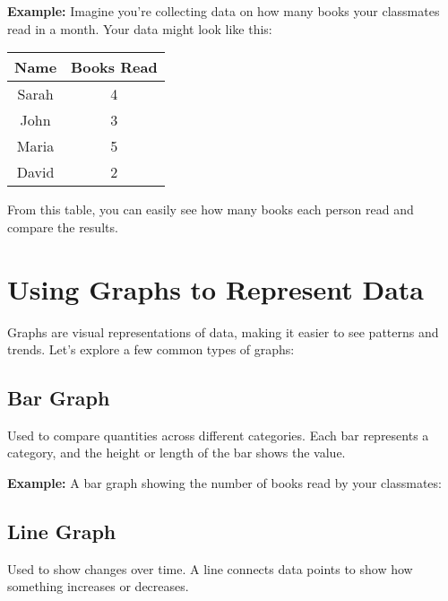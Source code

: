 \textbf{Example:} Imagine you're collecting data on how many books your classmates read in a month. Your data might look like this:

\begin{tabular}{|c|c|}
\hline
Name & Books Read \\
\hline
Sarah & 4 \\
John & 3 \\
Maria & 5 \\
David & 2 \\
\hline
\end{tabular}

From this table, you can easily see how many books each person read and compare the results.

\section{Using Graphs to Represent Data}
Graphs are visual representations of data, making it easier to see patterns and trends. Let’s explore a few common types of graphs:

\subsection{Bar Graph}
Used to compare quantities across different categories. Each bar represents a category, and the height or length of the bar shows the value.

\textbf{Example:} A bar graph showing the number of books read by your classmates:
\subsection{Line Graph}
Used to show changes over time. A line connects data points to show how something increases or decreases.

